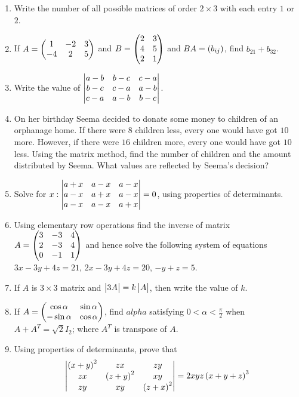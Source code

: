 \begin{enumerate}
    \item Write the number of all possible matrices of order $2 \times 3$ with each entry $1$ or $2$.
    \item If $A = \begin{pmatrix}1 & -2 & 3 \\ -4 & 2 & 5\end{pmatrix}$ and $B = \begin{pmatrix}2 & 3 \\ 4 & 5 \\ 2 & 1\end{pmatrix}$ and $BA = \left(b_{ij}\right)$, find $b_{21} + b_{32}$.
    \item Write the value of $\begin{vmatrix}{a-b} & {b-c} & {c-a} \\ {b-c} & {c-a} & {a-b}\\ {c-a} & {a-b} & {b-c}\end{vmatrix}$.
    \item On her birthday Seema decided to donate some money to children of an orphanage home. If there were $8$ children less, every one would have got \rupee$10$ more. However, if there were $16$ children more, every one would have got \rupee$10$ less. Using the matrix method, find the number of children and the amount distributed by Seema. What values are reflected by Seema's decision?
    \item Solve for $x : \begin{vmatrix}a+x & a-x & a-x \\ a-x & a+x & a-x \\ a-x & a-x & a+x\end{vmatrix} = 0$, using properties of determinants.
    \item Using elementary row operations find the inverse of matrix $A = \begin{pmatrix}3 & -3 & 4 \\ 2 & -3 & 4\\ 0 & -1 & 1\end{pmatrix}$ and hence solve the following system of equations $ 3x - 3y + 4z = 21$, $2x - 3y + 4z = 20$, $-y + z = 5$.
    \item If $A$ is $3\times 3$ matrix and $\begin{vmatrix}3A\end{vmatrix} = k\begin{vmatrix}A\end{vmatrix}$, then write the value of $k$.

    \item If $A = \begin{pmatrix}\cos{\alpha} & \sin{\alpha}\\ -\sin{\alpha} & \cos{\alpha}\end{pmatrix}$, find $alpha$ satisfying $0 < \alpha < \frac{\pi}{2}$ when $A + A^T = \sqrt{2}I_2$; where $A^T$ is transpose of $A$.

    \item Using properties of determinants, prove that
          \begin{align*}
              \begin{vmatrix}\left(x+y\right)^2 & zx           & zy \\
              zx                  & \left(z+y\right)^2 & xy \\ zy & xy & \left(z+x\right)^2\end{vmatrix} = 2xyz\left(x+y+z\right)^3
          \end{align*}


\end{enumerate}
